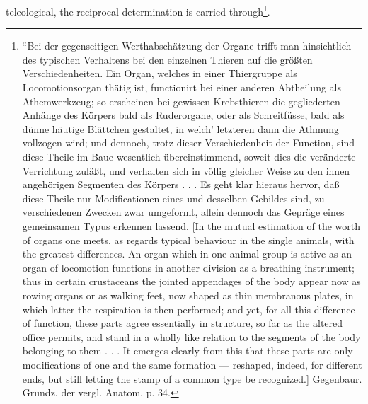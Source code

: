 \documentclass[12pt,a4paper]{book}
\begin{document}
teleological, the reciprocal determination is carried through\footnote{``Bei der
gegenseitigen Werthabschätzung der Organe trifft man hinsichtlich des typischen
Verhaltens bei den einzelnen Thieren auf die größten Verschiedenheiten. Ein Organ,
welches in einer Thiergruppe als Locomotionsorgan thätig ist, functionirt bei einer
anderen Abtheilung als Athemwerkzeug; so erscheinen bei gewissen Krebsthieren die
gegliederten Anhänge des Körpers bald als Ruderorgane, oder als Schreitfüsse, bald als
dünne häutige Blättchen gestaltet, in welch' letzteren dann die Athmung vollzogen wird;
und dennoch, trotz dieser Verschiedenheit der Function, sind diese Theile im Baue
wesentlich übereinstimmend, soweit dies die veränderte Verrichtung zuläßt, und
verhalten sich in völlig gleicher Weise zu den ihnen angehörigen Segmenten des Körpers
. . . Es geht klar hieraus hervor, daß diese Theile nur Modificationen eines und
desselben Gebildes sind, zu verschiedenen Zwecken zwar umgeformt, allein dennoch das
Gepräge eines gemeinsamen Typus erkennen lassend. [In the mutual estimation of the
worth of organs one meets, as regards typical behaviour in the single animals, with the
greatest differences. An organ which in one animal group is active as an organ of
locomotion functions in another division as a breathing instrument; thus in certain
crustaceans the jointed appendages of the body appear now as rowing organs or as
walking feet, now shaped as thin membranous plates, in which latter the respiration is
then performed; and yet, for all this difference of function, these parts agree
essentially in structure, so far as the altered office permits, and stand in a wholly
like relation to the segments of the body belonging to them . . . It emerges clearly
from this that these parts are only modifications of one and the same formation ---
reshaped, indeed, for different ends, but still letting the stamp of a common type be
recognized.] Gegenbaur. Grundz. der vergl. Anatom. p. 34.
}.
\end{document}
